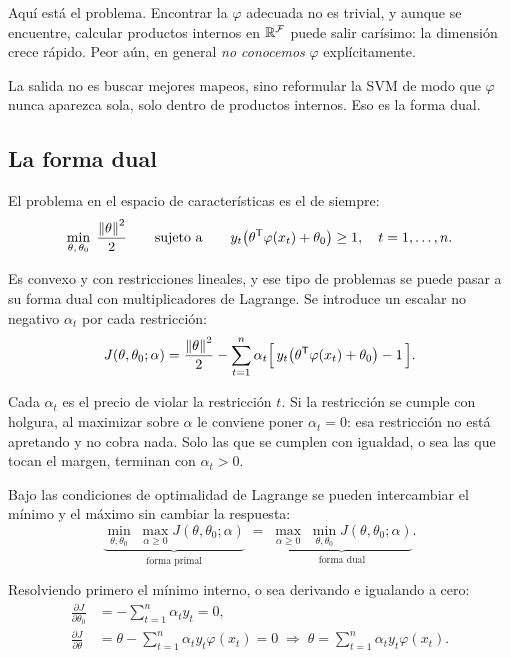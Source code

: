 \documentclass[11pt,letterpaper]{article}
\begin{document}
\begin{ojo}
  Aquí está el problema. Encontrar la $\varphi$ adecuada no es
  trivial, y aunque se encuentre, calcular productos internos en
  $\mathbb{R}^{\mathcal{F}}$ puede salir carísimo: la dimensión crece rápido.
  Peor aún, en general \emph{no conocemos} $\varphi$ explícitamente.
\end{ojo}

La salida no es buscar mejores mapeos, sino reformular la SVM de modo
que $\varphi$ nunca aparezca sola, solo dentro de productos internos.
Eso es la forma dual.


\subsection*{La forma dual}

El problema en el espacio de características es el de siempre:
\[
    \min_{\theta,\,\theta_0} \; \frac{\left\lVert \theta \right\rVert^{2}}{2}
    \qquad \text{sujeto a} \qquad
    y_t\big(\theta^{\mathsf{T}} \varphi(x_t) + \theta_0\big) \geq 1 ,
    \quad t = 1, \ldots, n .
\]

Es convexo y con restricciones lineales, y ese tipo de problemas se
puede pasar a su forma dual con multiplicadores de Lagrange. Se
introduce un escalar no negativo $\alpha_t$ por cada restricción:
\[
    J(\theta, \theta_0; \alpha) = \frac{\left\lVert \theta \right\rVert^{2}}{2}
    - \sum_{t=1}^{n} \alpha_t
      \Big[\, y_t\big(\theta^{\mathsf{T}} \varphi(x_t)
      + \theta_0\big) - 1 \,\Big] .
\]

\begin{idea}
  Cada $\alpha_t$ es el precio de violar la restricción $t$. Si la
  restricción se cumple con holgura, al maximizar sobre $\alpha$ le
  conviene poner $\alpha_t = 0$: esa restricción no está apretando y
  no cobra nada. Solo las que se cumplen con igualdad, o sea las que
  tocan el margen, terminan con $\alpha_t > 0$.
\end{idea}

Bajo las condiciones de optimalidad de Lagrange se pueden intercambiar
el mínimo y el máximo sin cambiar la respuesta:
\[
    \underbrace{\min_{\theta,\theta_0} \; \max_{\alpha \geq 0}
    J(\theta, \theta_0; \alpha)}_{\text{forma primal}}
    \;=\;
    \underbrace{\max_{\alpha \geq 0} \; \min_{\theta,\theta_0}
    J(\theta, \theta_0; \alpha)}_{\text{forma dual}} .
\]

Resolviendo primero el mínimo interno, o sea derivando e igualando a
cero:
\begin{align*}
    \frac{\partial J}{\partial \theta_0}
      &= - \sum_{t=1}^{n} \alpha_t y_t = 0 , \\
    \frac{\partial J}{\partial \theta}
      &= \theta - \sum_{t=1}^{n} \alpha_t y_t \varphi(x_t) = 0
      \;\Longrightarrow\;
      \theta = \sum_{t=1}^{n} \alpha_t y_t \varphi(x_t) .
\end{align*}
\end{document}
